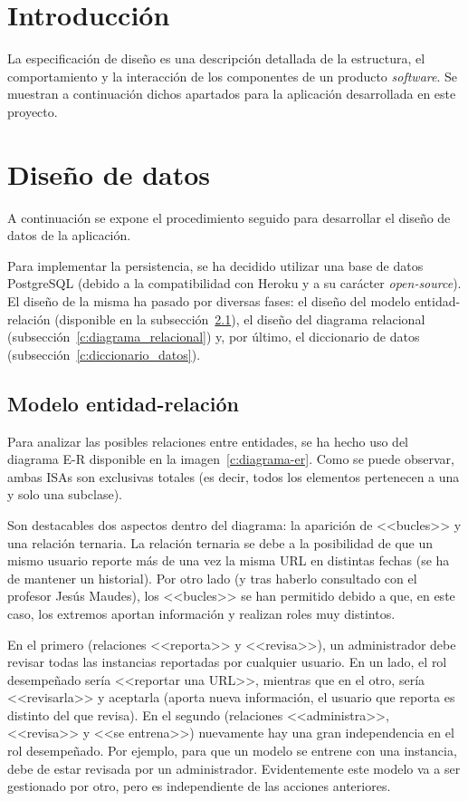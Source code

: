 \label{s:anexo-C}

\section{Introducción}

La especificación de diseño es una descripción detallada de la estructura, el comportamiento y la interacción de los componentes de un producto \textit{software}. Se muestran a continuación dichos apartados para la aplicación desarrollada en este proyecto.

\section{Diseño de datos}
\label{s:diseno-datos}
A continuación se expone el procedimiento seguido para desarrollar el diseño de datos de la aplicación.

Para implementar la persistencia, se ha decidido utilizar una base de datos PostgreSQL (debido a la compatibilidad con Heroku y a su carácter \textit{open-source}). El diseño de la misma ha pasado por diversas fases: el diseño del modelo entidad-relación (disponible en la subsección~\ref{c:diagrama_entidad_relacion}), el diseño del diagrama relacional (subsección~\ref{c:diagrama_relacional}) y, por último, el diccionario de datos (subsección~\ref{c:diccionario_datos}).


\subsection{Modelo entidad-relación}
\label{c:diagrama_entidad_relacion}

Para analizar las posibles relaciones entre entidades, se ha hecho uso del diagrama E-R disponible en la imagen~\ref{c:diagrama-er}. Como se puede observar, ambas ISAs son exclusivas totales (es decir, todos los elementos pertenecen a una y solo una subclase).

Son destacables dos aspectos dentro del diagrama: la aparición de <<bucles>> y una relación ternaria. La relación ternaria se debe a la posibilidad de que un mismo usuario reporte más de una vez la misma URL en distintas fechas (se ha de mantener un historial). Por otro lado (y tras haberlo consultado con el profesor Jesús Maudes), los <<bucles>> se han permitido debido a que, en este caso, los extremos aportan información y realizan roles muy distintos.

En el primero (relaciones <<reporta>> y <<revisa>>), un administrador debe revisar todas las instancias reportadas por cualquier usuario. En un lado, el rol desempeñado sería <<reportar una URL>>, mientras que en el otro, sería <<revisarla>> y aceptarla (aporta nueva información, el usuario que reporta es distinto del que revisa). En el segundo (relaciones <<administra>>, <<revisa>> y <<se entrena>>) nuevamente hay una gran independencia en el rol desempeñado. Por ejemplo, para que un modelo se entrene con una instancia, debe de estar revisada por un administrador. Evidentemente este modelo va a ser gestionado por otro, pero es independiente de las acciones anteriores.

